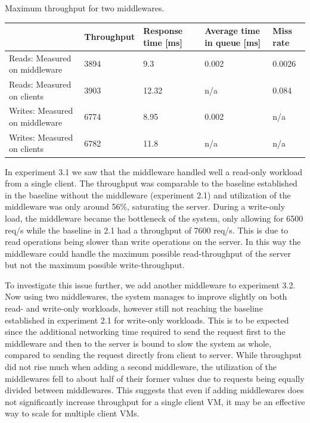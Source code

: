 \documentclass[11pt,a4paper]{article}
\begin{document}
\begin{center}
	{Maximum throughput for two middlewares.}
	\begin{tabular}{|l|p{2cm}|p{2cm}|p{2cm}|p{2cm}|}
		\hline                                & Throughput & Response time [ms] & Average time in queue [ms] & Miss rate \\ 
		\hline Reads: Measured on middleware  &    3894    &     9.3       &   0.002               &  0.0026   \\ 
		\hline Reads: Measured on clients     &    3903    &     12.32     & n/a                   &  0.084     \\ 
		\hline Writes: Measured on middleware &    6774    &     8.95      &   0.002               & n/a       \\ 
		\hline Writes: Measured on clients    &    6782    &     11.8      & n/a                   & n/a       \\ 
		\hline 
	\end{tabular}
\end{center}

In experiment 3.1 we saw that the middleware handled well a read-only workload from a single client. The throughput was comparable to the baseline established in the baseline without the middleware (experiment 2.1) and utilization of the middleware was only around 56\%, saturating the server. During a write-only load, the middleware became the bottleneck of the system, only allowing for 6500 req/s while the baseline in 2.1 had a throughput of 7600 req/s. This is due to read operations being slower than write operations on the server. In this way the middleware could handle the maximum possible read-throughput of the server but not the maximum possible write-throughput.

To investigate this issue further, we add another middleware to experiment 3.2. Now using two middlewares, the system manages to improve slightly on both read- and write-only workloads, however still not reaching the baseline established in experiment 2.1 for write-only workloads. This is to be expected since the additional networking time required to send the request first to the middleware and then to the server is bound to slow the system as whole, compared to sending the request directly from client to server. While throughput did not rise much when adding a second middleware, the utilization of the middlewares fell to about half of their former values due to requests being equally divided between middlewares. This suggests that even if adding middlewares does not significantly increase throughput for a single client VM, it may be an effective way to scale for multiple client VMs.
\end{document}
